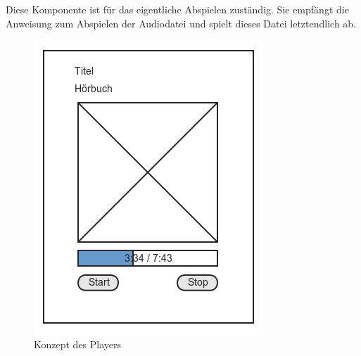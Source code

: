 Diese Komponente ist für das eigentliche Abspielen zuständig. Sie empfängt die Anweisung zum Abspielen der Audiodatei und spielt dieses Datei letztendlich ab.

\begin{figure}[ht]
\begin{minipage}[b]{0.45\linewidth}
\centering
\includegraphics[width=\textwidth]{images/playerkomp}
\caption{Konzept des Players}
\label{playerkomp}
\end{minipage}
\hspace{0.5cm}
\begin{minipage}[b]{0.45\linewidth}
\centering

\end{minipage}
\end{figure}
